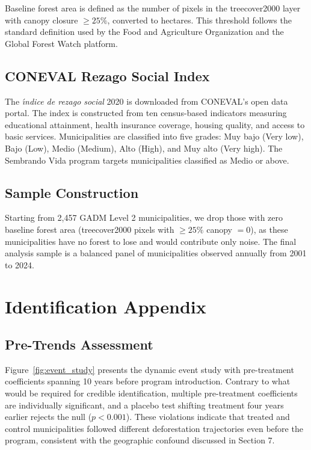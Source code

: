 \documentclass[12pt]{article}
\begin{document}
Baseline forest area is defined as the number of pixels in the treecover2000 layer with canopy closure $\geq 25\%$, converted to hectares. This threshold follows the standard definition used by the Food and Agriculture Organization and the Global Forest Watch platform.

\subsection{CONEVAL Rezago Social Index}

The \textit{\'{\i}ndice de rezago social} 2020 is downloaded from CONEVAL's open data portal. The index is constructed from ten census-based indicators measuring educational attainment, health insurance coverage, housing quality, and access to basic services. Municipalities are classified into five grades: Muy bajo (Very low), Bajo (Low), Medio (Medium), Alto (High), and Muy alto (Very high). The Sembrando Vida program targets municipalities classified as Medio or above.

\subsection{Sample Construction}

Starting from 2,457 GADM Level 2 municipalities, we drop those with zero baseline forest area (treecover2000 pixels with $\geq 25\%$ canopy $= 0$), as these municipalities have no forest to lose and would contribute only noise. The final analysis sample is a balanced panel of municipalities observed annually from 2001 to 2024.


\section{Identification Appendix}

\subsection{Pre-Trends Assessment}

Figure~\ref{fig:event_study} presents the dynamic event study with pre-treatment coefficients spanning 10 years before program introduction. Contrary to what would be required for credible identification, multiple pre-treatment coefficients are individually significant, and a placebo test shifting treatment four years earlier rejects the null ($p < 0.001$). These violations indicate that treated and control municipalities followed different deforestation trajectories even before the program, consistent with the geographic confound discussed in Section 7.
\end{document}

